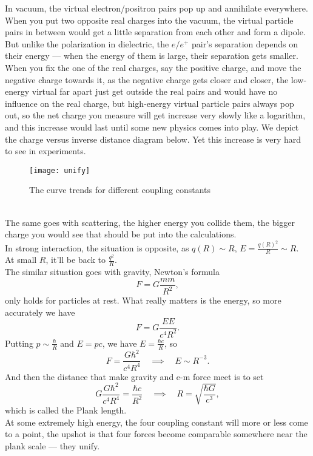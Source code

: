 \documentclass{article}
\newcommand{\be}{\begin{equation}}
\newcommand{\ee}{\end{equation}}
\renewcommand{\1}{\left}
\renewcommand{\2}{\right}
\newcommand{\rar}{\quad\implies\quad}
\begin{document}
In vacuum, the virtual electron/positron pairs pop up and annihilate everywhere. When you put two  opposite real charges into the vacuum, the virtual particle pairs in between would get a little separation from each other and form a dipole. But unlike the polarization in dielectric, the $e/e^+$ pair's separation depends on their energy --- when the energy of them is large, their separation gets smaller. When you fix the one of the real charges, say the positive charge, and move the negative charge towards it, as the negative charge gets closer and closer, the low-energy virtual far apart just get outside the real pairs and would have no influence on the real charge, but high-energy virtual particle pairs always pop out, so the net charge you measure will get increase very slowly like a logarithm, and this increase would last until some new physics comes into play. We depict the charge versus inverse distance diagram below. Yet this increase is very hard to see in experiments.
\begin{figure}[h]
\centering
\texttt{[image: unify]}
\caption{The curve trends for different coupling constants}
\end{figure}\\

The same goes with scattering, the higher energy you collide them, the bigger charge you would see that should be put into the calculations.\\

In strong interaction, the situation is opposite, as $q(R)\sim R$, $E=\frac{q(R)^2}{R}\sim R$. At small $R$, it'll be back to $\frac{q^2}{R}$.\\

The similar situation goes with gravity, Newton's formula
\be
F=G\frac{mm}{R^2},
\ee
only holds for particles at rest. What really matters is the energy, so more accurately we have
\be
F=G\frac{EE}{c^4R^2}.
\ee
Putting $p\sim\frac{\hbar}{R}$ and $E=pc$, we have $E=\frac{\hbar c}{R}$, so
\be
F=\frac{G\hbar^2}{c^4R^4} \rar E\sim R^{-3}.
\ee
And then the distance that make gravity and e-m force meet is to set 
\be
G\frac{G\hbar^2}{c^4R^4}=\frac{\hbar c}{R^2} \rar R=\sqrt{\frac{\hbar G}{c^3}},
\ee
which is called the Plank length.\\
At some extremely high energy, the four coupling constant will more or less come to a point, the upshot is that four forces become comparable somewhere near the plank scale --- they unify.
\end{document}
